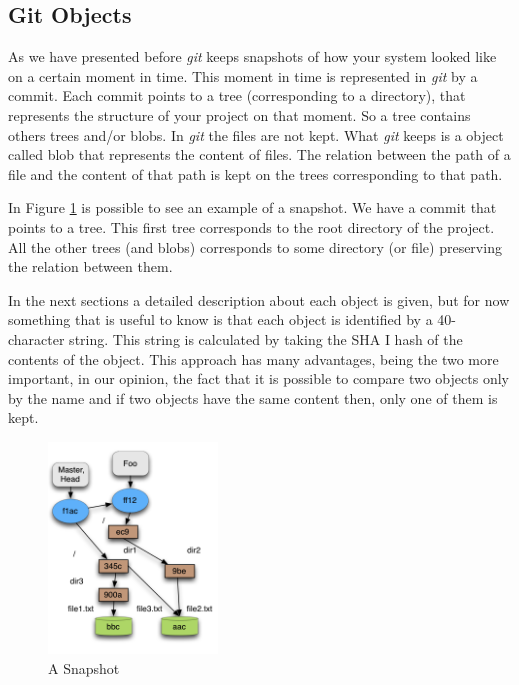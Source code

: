 \subsection{Git Objects}
As we have presented before \emph{git} keeps snapshots of how your system
looked like on a certain moment in time. This moment in time is
represented in \emph{git} by a commit. Each commit points to a tree
(corresponding to a directory), that
represents the structure of your project on that moment. So a tree
contains others trees and/or blobs. In \emph{git} the files are not kept. 
What \emph{git} keeps is a object called blob that represents the content of files. The
relation between the path of a file and the content of that path 
is kept on the trees corresponding to that path. \par
In Figure \ref{fig:snapshot} is possible to see an example of a snapshot. We
have a commit that points to a tree. This first tree corresponds to
the root directory of the project. All the other trees (and blobs)
corresponds to some directory (or file) preserving the relation
between them. \par
In the next sections a detailed description about each object is
given, but for now something that is useful to know is that each
object is identified by a 40-character string. This string is
calculated by taking the SHA I hash of the contents of the object.
This approach has many advantages, being the two more important, in our
opinion, the
fact that it is possible to compare two objects only by the name and
if two objects have the same content then, only one of them is kept.\par

\begin{figure}[!t]
   \centering
   \includegraphics[width=0.4\textwidth]{images/object_assoc.png}
   \caption{A Snapshot}
   \label{fig:snapshot}
\end{figure}

